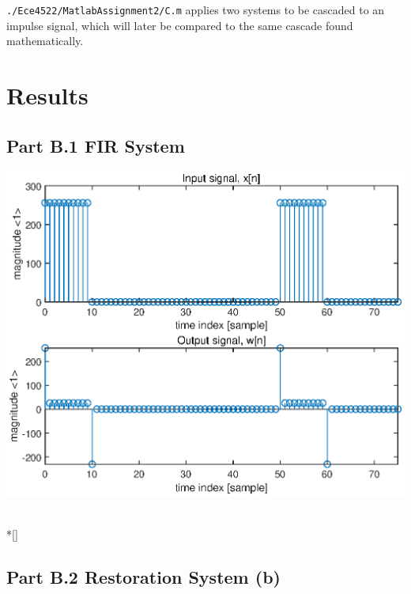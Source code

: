 \documentclass[conference]{../lib/IEEEtran}
\renewenvironment*{figure}[1][]
    {
        \minipage{\linewidth}
    }
    {
        \endminipage
        \\*[\intextsep]
    }
\DeclarePairedDelimiter\brao()%
\DeclarePairedDelimiter\brac[]%
\begin{document}
\texttt{./Ece4522/MatlabAssignment2/C.m} applies two systems to be cascaded to an impulse signal, which will later be compared to the same cascade found mathematically.

\section{Results}

\subsection{Part B.1 FIR System}

\begin{figure}
    \centering
    \includegraphics[width=\linewidth]{ece4522ma2fig1.eps}
    \label{fig:B.1-fig1}
\end{figure}

\subsection{Part B.2 Restoration System (b)}
\end{document}
